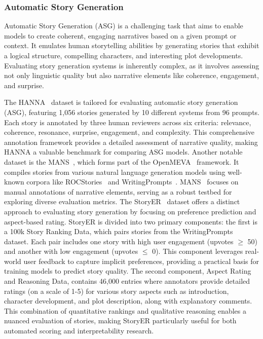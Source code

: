 \subsubsection{Automatic Story Generation}
\label{sec:Automatic Story Generation}
Automatic Story Generation (ASG) is a challenging task that aims to enable models to create coherent, engaging narratives based on a given prompt or context. It emulates human storytelling abilities by generating stories that exhibit a logical structure, compelling characters, and interesting plot developments. Evaluating story generation systems is inherently complex, as it involves assessing not only linguistic quality but also narrative elements like coherence, engagement, and surprise.


The HANNA~\cite{chhun2022human} dataset is tailored for evaluating automatic story generation (ASG), featuring 1,056 stories generated by 10 different systems from 96 prompts. Each story is annotated by three human reviewers across six criteria: relevance, coherence, resonance, surprise, engagement, and complexity. This comprehensive annotation framework provides a detailed assessment of narrative quality, making HANNA a valuable benchmark for comparing ASG models.
Another notable dataset is the MANS~\cite{guan2021openmeva}, which forms part of the OpenMEVA~\cite{guan2021openmeva} framework. It compiles stories from various natural language generation models using well-known corpora like ROCStories~\cite{mostafazadeh2016corpus} and WritingPrompts~\cite{fan2018hierarchical}. MANS~\cite{guan2021openmeva} focuses on manual annotations of narrative elements, serving as a robust testbed for exploring diverse evaluation metrics.
The StoryER~\cite{chen2023storyer} dataset offers a distinct approach to evaluating story generation by focusing on preference prediction and aspect-based rating. StoryER is divided into two primary components: the first is a 100k Story Ranking Data, which pairs stories from the WritingPrompts dataset. Each pair includes one story with high user engagement (upvotes $\ge$ 50) and another with low engagement (upvotes $\le$ 0). This component leverages real-world user feedback to capture implicit preferences, providing a practical basis for training models to predict story quality. The second component, Aspect Rating and Reasoning Data, contains 46,000 entries where annotators provide detailed ratings (on a scale of 1-5) for various story aspects such as introduction, character development, and plot description, along with explanatory comments. This combination of quantitative rankings and qualitative reasoning enables a nuanced evaluation of stories, making StoryER particularly useful for both automated scoring and interpretability research.
